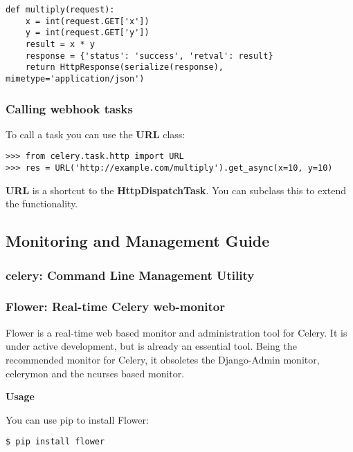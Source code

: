 \documentclass[9pt,a4paper]{article}
\begin{document}
\begin{CJK*}{GBK}{kai}
\begin{Verbatim}[frame=single]
def multiply(request):
    x = int(request.GET['x'])
    y = int(request.GET['y'])
    result = x * y
    response = {'status': 'success', 'retval': result}
    return HttpResponse(serialize(response), mimetype='application/json')
\end{Verbatim}

\subsubsection{Calling webhook tasks}
To call a task you can use the \textbf{URL} class:

\begin{Verbatim}[frame=single]
>>> from celery.task.http import URL
>>> res = URL('http://example.com/multiply').get_async(x=10, y=10)
\end{Verbatim}

\textbf{URL} is a shortcut to the \textbf{HttpDispatchTask}. You can subclass this to extend the functionality.

\subsection{Monitoring and Management Guide}

\subsubsection{celery: Command Line Management Utility}
\subsubsection{Flower: Real-time Celery web-monitor}
Flower is a real-time web based monitor and administration tool for Celery. It is under active development, but is already an essential tool. Being the recommended monitor for Celery, it obsoletes the Django-Admin monitor, celerymon and the ncurses based monitor.

\textbf{Usage}

You can use pip to install Flower:
\begin{Verbatim}[frame=single]
$ pip install flower
\end{Verbatim}


\end{CJK*}
\end{document}
